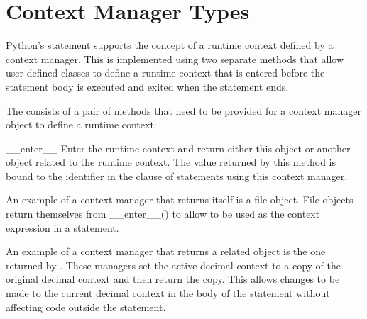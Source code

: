 \section{Context Manager Types \label{typecontextmanager}}


Python's  statement supports the concept of a runtime
context defined by a context manager.  This is implemented using
two separate methods that allow user-defined classes to define
a runtime context that is entered before the statement body is
executed and exited when the statement ends.

The  consists of a pair of
methods that need to be provided for a context manager object to
define a runtime context:

\begin{methoddesc}{__enter__}{}
  Enter the runtime context and return either this object or another
  object related to the runtime context. The value returned by this
  method is bound to the identifier in the  clause of
   statements using this context manager.

  An example of a context manager that returns itself is a file object.
  File objects return themselves from __enter__() to allow
   to be used as the context expression in a
   statement.

  An example of a context manager that returns a related
  object is the one returned by .
  These managers set the active decimal context to a copy of the
  original decimal context and then return the copy. This allows
  changes to be made to the current decimal context in the body of
  the  statement without affecting code outside
  the  statement.
\end{methoddesc}

